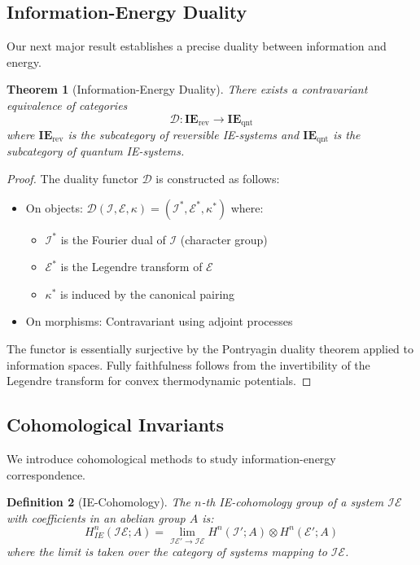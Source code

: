 \documentclass[12pt]{article}
\newtheorem{theorem}{Theorem}[section]
\newtheorem{definition}[theorem]{Definition}
\DeclareMathOperator{\lim}{lim}
\begin{document}
\subsection{Information-Energy Duality}

Our next major result establishes a precise duality between information and energy.

\begin{theorem}[Information-Energy Duality]
There exists a contravariant equivalence of categories
\[\mathcal{D}: \mathbf{IE}_{\text{rev}} \to \mathbf{IE}_{\text{qnt}}\]
where $\mathbf{IE}_{\text{rev}}$ is the subcategory of reversible IE-systems and $\mathbf{IE}_{\text{qnt}}$ is the subcategory of quantum IE-systems.
\end{theorem}

\begin{proof}
The duality functor $\mathcal{D}$ is constructed as follows:
\begin{itemize}
\item On objects: $\mathcal{D}(\mathcal{I}, \mathcal{E}, \kappa) = (\mathcal{I}^*, \mathcal{E}^*, \kappa^*)$ where:
  \begin{itemize}
  \item $\mathcal{I}^*$ is the Fourier dual of $\mathcal{I}$ (character group)
  \item $\mathcal{E}^*$ is the Legendre transform of $\mathcal{E}$
  \item $\kappa^*$ is induced by the canonical pairing
  \end{itemize}
\item On morphisms: Contravariant using adjoint processes
\end{itemize}

The functor is essentially surjective by the Pontryagin duality theorem applied to information spaces. Fully faithfulness follows from the invertibility of the Legendre transform for convex thermodynamic potentials.
\end{proof}

\subsection{Cohomological Invariants}

We introduce cohomological methods to study information-energy correspondence.

\begin{definition}[IE-Cohomology]
The $n$-th IE-cohomology group of a system $\mathcal{IE}$ with coefficients in an abelian group $A$ is:
\[H^n_{IE}(\mathcal{IE}; A) = \lim_{\mathcal{IE}' \to \mathcal{IE}} H^n(\mathcal{I}'; A) \otimes H^n(\mathcal{E}'; A)\]
where the limit is taken over the category of systems mapping to $\mathcal{IE}$.
\end{definition}
\end{document}

